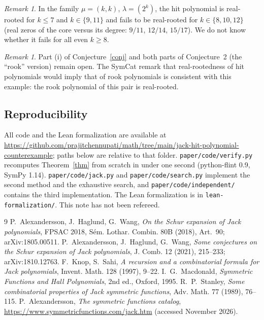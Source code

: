 \documentclass[11pt]{article}
\theoremstyle{remark}
\newtheorem{remark}[theorem]{Remark}
\begin{document}
\begin{remark}
In the family $\mu=(k,k)$, $\lambda=(2^k)$, the hit polynomial is real-rooted for $k\le 7$ and $k\in\{9,11\}$
and fails to be real-rooted for $k\in\{8,10,12\}$ (real zeros of the core versus its degree: $9/11$, $12/14$,
$15/17$). We do not know whether it fails for all even $k\ge 8$.
\end{remark}

\begin{remark}
Part (i) of Conjecture~\ref{conj} and both parts of Conjecture~2 (the ``rook'' version) remain open. The
SymCat remark that real-rootedness of hit polynomials would imply that of rook polynomials is consistent with
this example: the rook polynomial of this pair is real-rooted.
\end{remark}

\subsection*{Reproducibility}
{\sloppy All code and the Lean formalization are available at
\url{https://github.com/prajitchennupati/math/tree/main/jack-hit-polynomial-counterexample}; paths below are
relative to that folder. \texttt{paper/code/verify.py} recomputes Theorem~\ref{thm} from scratch in under one second (python-flint 0.9,
SymPy 1.14). \texttt{paper/code/jack.py} and \texttt{paper/code/search.py} implement the second method and the
exhaustive search, and \texttt{paper/code/independent/} contains the third implementation. The Lean
formalization is in \texttt{lean-formalization/}. This note has not been refereed.\par}

\begin{thebibliography}{9}
 P.~Alexandersson, J.~Haglund, G.~Wang, \emph{On the Schur expansion of Jack polynomials},
FPSAC 2018, S\'em. Lothar. Combin. 80B (2018), Art.~90; arXiv:1805.00511.
 P.~Alexandersson, J.~Haglund, G.~Wang, \emph{Some conjectures on the Schur expansion of Jack
polynomials}, J. Comb. 12 (2021), 215--233; arXiv:1810.12763.
 F.~Knop, S.~Sahi, \emph{A recursion and a combinatorial formula for Jack polynomials},
Invent. Math. 128 (1997), 9--22.
 I.~G.~Macdonald, \emph{Symmetric Functions and Hall Polynomials}, 2nd ed., Oxford, 1995.
 R.~P.~Stanley, \emph{Some combinatorial properties of Jack symmetric functions},
Adv. Math. 77 (1989), 76--115.
 P.~Alexandersson, \emph{The symmetric functions catalog}, \url{https://www.symmetricfunctions.com/jack.htm}
(accessed November 2026).
\end{thebibliography}
\end{document}
